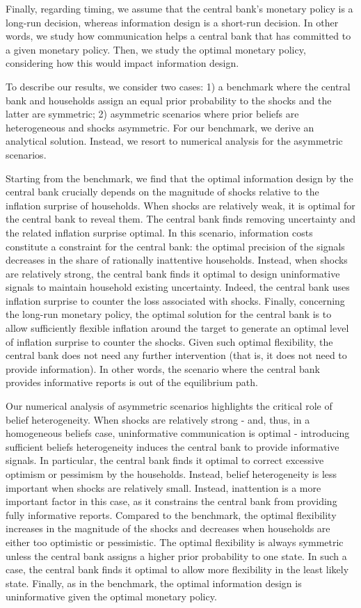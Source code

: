 \documentclass[12pt,a4paper]{article}
\begin{document}
Finally, regarding timing, we assume that the central bank's monetary policy is a long-run decision, whereas information design is a short-run decision. In other words, we study how communication helps a central bank that has committed to a given monetary policy. Then, we study the optimal monetary policy, considering how this would impact information design.

To describe our results, we consider two cases: 1) a benchmark where the central bank and households assign an equal prior probability to the shocks and the latter are symmetric; 2) asymmetric scenarios where prior beliefs are heterogeneous and shocks asymmetric. For our benchmark, we derive an analytical solution. Instead, we resort to numerical analysis for the asymmetric scenarios. 

Starting from the benchmark, we find that the optimal information design by the central bank crucially depends on the magnitude of shocks relative to the inflation surprise of households. When shocks are relatively weak, it is optimal for the central bank to reveal them. The central bank finds removing uncertainty and the related inflation surprise optimal. In this scenario, information costs constitute a constraint for the central bank: the optimal precision of the signals decreases in the share of rationally inattentive households. Instead, when shocks are relatively strong, the central bank finds it optimal to design uninformative signals to maintain household existing uncertainty. Indeed, the central bank uses inflation surprise to counter the loss associated with shocks. 
Finally, concerning the long-run monetary policy, the optimal solution for the central bank is to allow sufficiently flexible inflation around the target to generate an optimal level of inflation surprise to counter the shocks. Given such optimal flexibility, the central bank does not need any further intervention (that is, it does not need to provide information). In other words, the scenario where the central bank provides informative reports is out of the equilibrium path. 

Our numerical analysis of asymmetric scenarios highlights the critical role of belief heterogeneity. When shocks are relatively strong - and, thus, in a homogeneous beliefs case, uninformative communication is optimal - introducing sufficient beliefs heterogeneity induces the central bank to provide informative signals. In particular, the central bank finds it optimal to correct excessive optimism or pessimism by the households. Instead, belief heterogeneity is less important when shocks are relatively small. Instead, inattention is a more important factor in this case, as it constrains the central bank from providing fully informative reports. Compared to the benchmark, the optimal flexibility increases in the magnitude of the shocks and decreases when households are either too optimistic or pessimistic. The optimal flexibility is always symmetric unless the central bank assigns a higher prior probability to one state. In such a case, the central bank finds it optimal to allow more flexibility in the least likely state. Finally, as in the benchmark, the optimal information design is uninformative given the optimal monetary policy.
\end{document}
